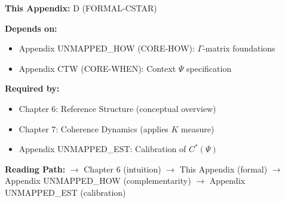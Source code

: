 \begin{tcolorbox}[colback=gray!10!white, colframe=gray!75!black,
    title=\textbf{Cross-Reference Footer}]

\textbf{This Appendix:} D (FORMAL-CSTAR)

\textbf{Depends on:}
\begin{itemize}[nosep]
    \item Appendix UNMAPPED_HOW (CORE-HOW): $\Gamma$-matrix foundations
    \item Appendix CTW (CORE-WHEN): Context $\Psi$ specification
\end{itemize}

\textbf{Required by:}
\begin{itemize}[nosep]
    \item Chapter 6: Reference Structure (conceptual overview)
    \item Chapter 7: Coherence Dynamics (applies $K$ measure)
    \item Appendix UNMAPPED_EST: Calibration of $C^*(\Psi)$
\end{itemize}

\textbf{Reading Path:}
$\rightarrow$ Chapter 6 (intuition) $\rightarrow$ This Appendix (formal)
$\rightarrow$ Appendix UNMAPPED_HOW (complementarity) $\rightarrow$ Appendix UNMAPPED_EST (calibration)

\end{tcolorbox}

